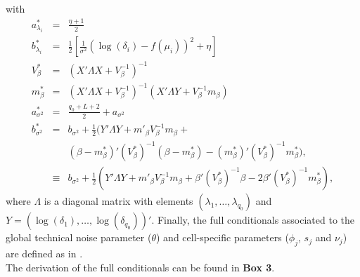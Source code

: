 with \begin{eqnarray}
a^*_{\lambda_i} & = & \frac{\eta+1}{2} \\
b^*_{\lambda_i} & = & \frac{1}{2}\left[\frac{1}{\sigma^2}(\log(\delta_i)-f(\mu_i))^2+\eta\right] \\
V^*_{\beta} & = & (X' \Lambda X + V_\beta^{-1})^{-1} \\
m^*_{\beta} & = & (X' \Lambda X+V_\beta^{-1})^{-1}(X' \Lambda Y + V_\beta^{-1}m_\beta{}) \\
a^*_{\sigma^2} & = & \frac{q_0+L+2}{2}+a_{\sigma^2}\\
b^*_{\sigma^2} & = & b_{\sigma^2}+\frac{1}{2}(Y'\Lambda Y+ m'_{\beta} V_\beta^{-1} m_\beta+ \nonumber \\
&  &(\beta-m^*_{\beta})' (V^*_{\beta})^{-1} (\beta-m^*_{\beta}) - (m^*_{\beta})' (V^*_{\beta})^{-1} m^*_{\beta}),  \\
& \equiv & b_{\sigma^2}+\frac{1}{2}(Y'\Lambda Y+ m'_{\beta} V_\beta^{-1} m_\beta + \beta' (V^*_{\beta})^{-1} \beta - 2 \beta' (V^*_{\beta})^{-1} m^*_{\beta} ),
\end{eqnarray} where $\Lambda$ is a diagonal matrix with elements $(\lambda_1, \ldots, \lambda_{q_0})$ and $Y = (\log(\delta_1), \ldots, \log(\delta_{q_0}))'$. Finally, the full conditionals associated to the global technical noise parameter ($\theta$) and cell-specific parameters ($\phi_j$, $s_j$ and $\nu_j$) are defined as in \cite{Vallejos2016}.\\

The derivation of the full conditionals can be found in \textbf{Box 3}.


